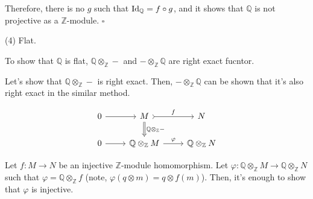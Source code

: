 \documentclass{article}
\newcommand{\qedsq}{\hfill$\square$}
\newcommand{\bbQ}{\mathbb{Q}}
\newcommand{\bbZ}{\mathbb{Z}}
\newcommand{\Id}{\textnormal{Id}}
\begin{document}
Therefore, there is no \(g\) such that \(\Id_\bbQ = f \circ g\), and it shows that \(\bbQ\) is not projective as a \(\bbZ\)-module.
\qedsq
\newline

\noindent
(4) Flat.

To show that \(\bbQ\) is flat, \(\bbQ \otimes_\bbZ -\) and \(- \otimes_\bbZ \bbQ\) are right exact fucntor.

Let's show that \(\bbQ \otimes_\bbZ -\) is right exact. Then, \(- \otimes_\bbZ \bbQ\) can be shown that it's also right exact in the similar method.

\[\begin{tikzcd}
  0 \ar[->]{r} & M \ar[>->, "f"]{r} \ar[Rightarrow, "\bbQ \otimes_\bbZ -"]{d} & N
  \\
  0 \ar[->]{r} & \bbQ \otimes_\bbZ M \ar[->, "\varphi"]{r} & \bbQ \otimes_\bbZ N
\end{tikzcd}\]

Let \(f: M \to N\) be an injective \(\bbZ\)-module homomorphism.
Let \(\varphi: \bbQ \otimes_\bbZ M \to \bbQ \otimes_\bbZ N\) such that \(\varphi = \bbQ \otimes_\bbZ f\) (note, \(\varphi(q \otimes m) = q \otimes f(m)\)).
Then, it's enough to show that \(\varphi\) is injective.
\end{document}
